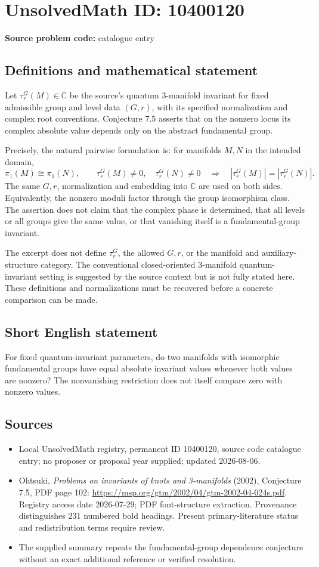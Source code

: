 \documentclass[11pt]{article}
\newcommand{\C}{\mathbb{C}}
\begin{document}
\section*{UnsolvedMath ID: 10400120}
\textbf{Source problem code:} catalogue entry
\subsection{Definitions and mathematical statement}
Let \(\tau_r^G(M)\in\C\) be the source's quantum 3-manifold invariant for fixed admissible group and level data \((G,r)\), with its specified normalization and complex root conventions. Conjecture 7.5 asserts that on the nonzero locus its complex absolute value depends only on the abstract fundamental group.

Precisely, the natural pairwise formulation is: for manifolds \(M,N\) in the intended domain,
\[
 \pi_1(M)\cong\pi_1(N),\qquad
 \tau_r^G(M)\ne0,\quad\tau_r^G(N)\ne0
 \quad\Longrightarrow\quad
 |\tau_r^G(M)|=|\tau_r^G(N)|.
\]
The same \(G,r\), normalization and embedding into \(\C\) are used on both sides. Equivalently, the nonzero moduli factor through the group isomorphism class. The assertion does not claim that the complex phase is determined, that all levels or all groups give the same value, or that vanishing itself is a fundamental-group invariant.

The excerpt does not define \(\tau_r^G\), the allowed \(G,r\), or the manifold and auxiliary-structure category. The conventional closed-oriented 3-manifold quantum-invariant setting is suggested by the source context but is not fully stated here. These definitions and normalizations must be recovered before a concrete comparison can be made.
\subsection{Short English statement}
For fixed quantum-invariant parameters, do two manifolds with isomorphic fundamental groups have equal absolute invariant values whenever both values are nonzero? The nonvanishing restriction does not itself compare zero with nonzero values.
\subsection{Sources}
\begin{itemize}
\item Local UnsolvedMath registry, permanent ID 10400120, source code catalogue entry; no proposer or proposal year supplied; updated 2026-08-06.
\item Ohtsuki, \emph{Problems on invariants of knots and 3-manifolds} (2002), Conjecture 7.5, PDF page 102: \url{https://msp.org/gtm/2002/04/gtm-2002-04-024s.pdf}. Registry access date 2026-07-29; PDF font-structure extraction. Provenance distinguishes 231 numbered bold headings. Present primary-literature status and redistribution terms require review.
\item The supplied summary repeats the fundamental-group dependence conjecture without an exact additional reference or verified resolution.
\end{itemize}
\end{document}
